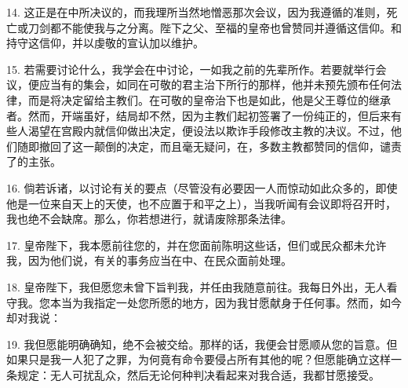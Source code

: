 14. 这正是在中所决议的，而我理所当然地憎恶那次会议，因为我遵循的准则，死亡或刀剑都不能使我与之分离。陛下之父、至福的皇帝也曾赞同并遵循这信仰。和持守这信仰，并以虔敬的宣认加以维护。\par

15. 若需要讨论什么，我学会在中讨论，一如我之前的先辈所作。若要就举行会议，便应当有的集会，如同在可敬的君主治下所行的那样，他并未预先颁布任何法律，而是将决定留给主教们。在可敬的皇帝治下也是如此，他是父王尊位的继承者。然而，开端虽好，结局却不然，因为主教们起初签署了一份纯正的，但后来有些人渴望在宫殿内就信仰做出决定，便设法以欺诈手段修改主教的决议。不过，他们随即撤回了这一颠倒的决定，而且毫无疑问，在，多数主教都赞同的信仰，谴责了的主张。\par

16. 倘若诉诸，以讨论有关的要点（尽管没有必要因一人而惊动如此众多的，即使他是一位来自天上的天使，也不应置于和平之上），当我听闻有会议即将召开时，我也绝不会缺席。那么，你若想进行，就请废除那条法律。\par

17. 皇帝陛下，我本愿前往您的，并在您面前陈明这些话，但们或民众都未允许我，因为他们说，有关的事务应当在中、在民众面前处理。\par

18. 皇帝陛下，我但愿您未曾下旨判我，并任由我随意前往。我每日外出，无人看守我。您本当为我指定一处您所愿的地方，因为我甘愿献身于任何事。然而，如今却对我说：\par

19. 我但愿能明确确知，绝不会被交给。那样的话，我便会甘愿顺从您的旨意。但如果只是我一人犯了之罪，为何竟有命令要侵占所有其他的呢？但愿能确立这样一条规定：无人可扰乱众，然后无论何种判决看起来对我合适，我都甘愿接受。\par

